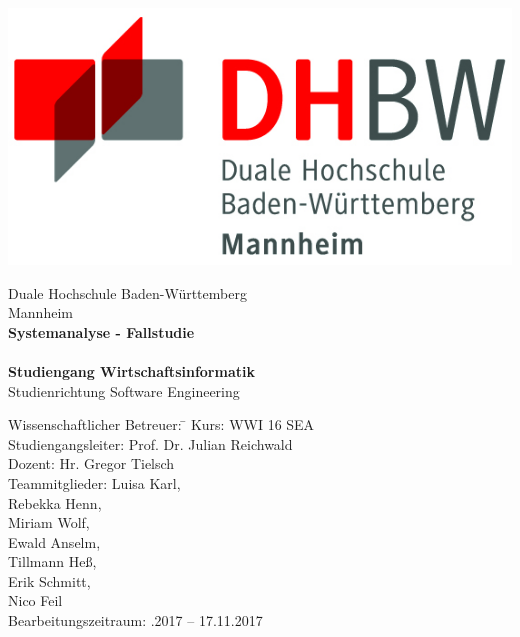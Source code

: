 \begin{titlepage}
\begin{minipage}{\textwidth}
		\vspace{-2cm}
		\noindent  
		\centering \includegraphics{img/logo.jpg}
\end{minipage}
\vspace{1em}
\sffamily
\begin{center}
	\textsf{\large{}Duale Hochschule Baden-W\"urttemberg\\[1.5mm] Mannheim}\\[2em]
	\textsf{\textbf{\Large{}Systemanalyse - Fallstudie}}\\[3mm]
	\textsf{\textbf{\DerTitelDerArbeit}} \\[1.5cm]
	\textsf{\textbf{\Large{}Studiengang Wirtschaftsinformatik}\\[3mm] \textsf{Studienrichtung Software Engineering}}
	
	\vspace{5em}

\begin{minipage}{\textwidth}

\begin{tabbing}
	Wissenschaftlicher Betreuer:
	\hspace{0.5cm}\=\kill
	Kurs: \> WWI 16 SEA \\[1.5mm]
	Studiengangsleiter: \> Prof. Dr. Julian Reichwald  \\[1.5mm]
	Dozent: \> Hr. Gregor Tielsch  \\[1.5mm]
	Teammitglieder: \> Luisa Karl, \\ \> Rebekka Henn, \\ \> Miriam Wolf, \\ \> Ewald Anselm, \\ \> Tillmann Heß, \\ \> Erik Schmitt, \\ \> Nico Feil \\[1.5mm]
	Bearbeitungszeitraum: .2017 -- 17.11.2017
\end{tabbing}
\end{minipage}

\end{center}

\end{titlepage}
